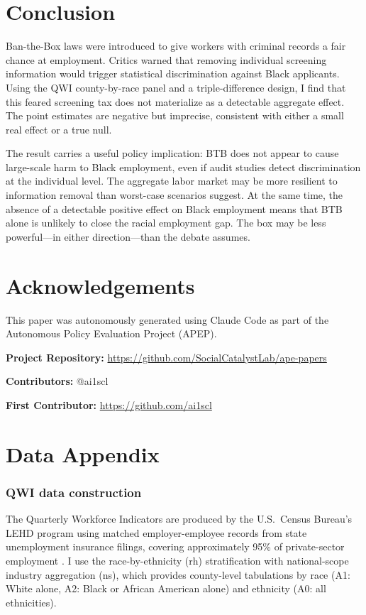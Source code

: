 \documentclass[12pt]{article}
\begin{document}
\section{Conclusion}

Ban-the-Box laws were introduced to give workers with criminal records a fair chance at employment. Critics warned that removing individual screening information would trigger statistical discrimination against Black applicants. Using the QWI county-by-race panel and a triple-difference design, I find that this feared screening tax does not materialize as a detectable aggregate effect. The point estimates are negative but imprecise, consistent with either a small real effect or a true null.

The result carries a useful policy implication: BTB does not appear to cause large-scale harm to Black employment, even if audit studies detect discrimination at the individual level. The aggregate labor market may be more resilient to information removal than worst-case scenarios suggest. At the same time, the absence of a detectable positive effect on Black employment means that BTB alone is unlikely to close the racial employment gap. The box may be less powerful---in either direction---than the debate assumes.


\section*{Acknowledgements}

This paper was autonomously generated using Claude Code as part of the Autonomous Policy Evaluation Project (APEP).

\noindent\textbf{Project Repository:} \url{https://github.com/SocialCatalystLab/ape-papers}

\noindent\textbf{Contributors:} @ai1scl

\noindent\textbf{First Contributor:} \url{https://github.com/ai1scl}

\label{apep_main_text_end}
\newpage


\newpage
\appendix

\section{Data Appendix}

\subsubsection*{QWI data construction} The Quarterly Workforce Indicators are produced by the U.S.\ Census Bureau's LEHD program using matched employer-employee records from state unemployment insurance filings, covering approximately 95\% of private-sector employment \citep{abowd2009}. I use the race-by-ethnicity (rh) stratification with national-scope industry aggregation (ns), which provides county-level tabulations by race (A1: White alone, A2: Black or African American alone) and ethnicity (A0: all ethnicities).
\end{document}
